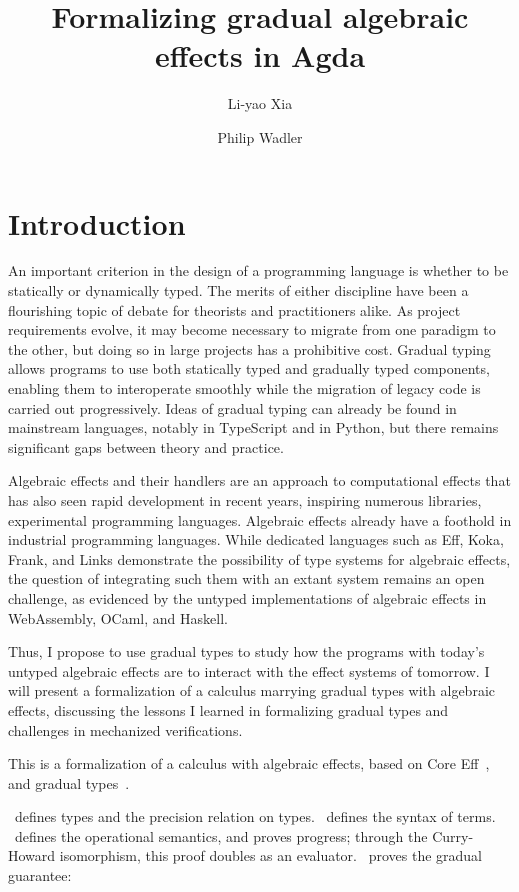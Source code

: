 \documentclass[\ClassReview acmsmall,screen,prologue,dvipsnames,style=authoryear,anonymous]{acmart}
\author[L. Xia]{Li-yao Xia}
\affiliation{
  \institution{University of Edinburgh}
  \city{Edinburgh}\country{United Kingdom}
}
\author[P. Wadler]{Philip Wadler}
\affiliation{
  \institution{University of Edinburgh}
  \city{Edinburgh}\country{United Kingdom}
}
\title{Formalizing gradual algebraic effects in Agda}
\begin{document}
\maketitle

\section{Introduction}

An important criterion in the design of a programming language is whether
to be statically or dynamically typed. The merits of either discipline have been
a flourishing topic of debate for theorists and practitioners alike.
As project requirements evolve, it may become necessary to migrate from one
paradigm to the other, but doing so in large projects has a prohibitive
cost.
Gradual typing allows programs to use both statically typed and
gradually typed components, enabling them to interoperate smoothly
while the migration of legacy code is carried out progressively.
Ideas of gradual typing can already be found in mainstream languages,
notably in TypeScript and in Python, but there remains significant gaps between
theory and practice.

Algebraic effects and their handlers are an approach to computational effects
that has also seen rapid development in recent years, inspiring numerous
libraries, experimental programming languages. Algebraic effects already have a
foothold in industrial programming languages. While dedicated languages such as
Eff, Koka, Frank, and Links demonstrate the possibility of type systems for
algebraic effects, the question of integrating such them with an extant system
remains an open challenge, as evidenced by the untyped implementations of
algebraic effects in WebAssembly, OCaml, and Haskell.

Thus, I propose to use gradual types to study how the programs with today's
untyped algebraic effects are to interact with the effect systems of tomorrow.
I will present a formalization of a calculus marrying gradual types with
algebraic effects, discussing the lessons I learned in formalizing gradual types
and challenges in mechanized verifications.

This is a formalization of a calculus with algebraic effects,
based on Core Eff~\citep{bauer2015programming}, and gradual types~\citep{siek2015}.

~defines types and the precision relation on types.
~defines the syntax of terms.
~defines the operational semantics, and proves progress;
through the Curry-Howard isomorphism, this proof doubles as an evaluator.
~proves the gradual guarantee:
\end{document}

